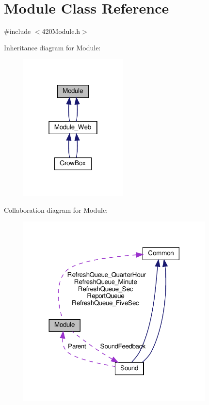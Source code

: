\hypertarget{class_module}{}\section{Module Class Reference}
\label{class_module}


{\ttfamily \#include $<$420\+Module.\+h$>$}



Inheritance diagram for Module\+:
\nopagebreak
\begin{figure}[H]
\begin{center}
\leavevmode
\includegraphics[width=154pt]{class_module__inherit__graph}
\end{center}
\end{figure}


Collaboration diagram for Module\+:
\nopagebreak
\begin{figure}[H]
\begin{center}
\leavevmode
\includegraphics[width=281pt]{class_module__coll__graph}
\end{center}
\end{figure}
